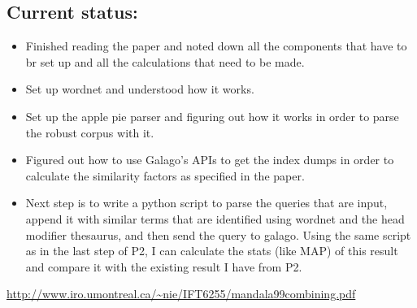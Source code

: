 \documentclass[12pt,letterpaper]{article}
\begin{document}
\subsection*{Current status:}
\begin{itemize}
\item Finished reading the paper and noted down all the components that have to br set up and all the calculations that need to be made. 
\item Set up wordnet and understood how it works.
\item Set up the apple pie parser and figuring out how it works in order to parse the robust corpus with it.
\item Figured out how to use Galago's APIs to get the index dumps in order to calculate the similarity factors as specified in the paper.
\item Next step is to write a python script to parse the queries that are input, append it with similar terms that are identified using wordnet and the head modifier thesaurus, and then send the query to galago. Using the same script as in the last step of P2, I can calculate the stats (like MAP) of this result and compare it with the existing result I have from P2.
\end{itemize}  

\begin{thebibliography}{}
 \url{http://www.iro.umontreal.ca/~nie/IFT6255/mandala99combining.pdf}
\end{thebibliography}
\end{document}
